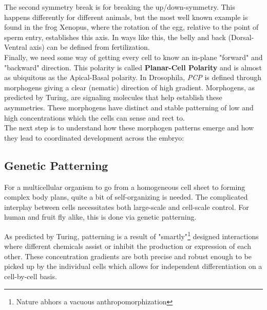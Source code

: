 The second symmetry break is for breaking the up/down-symmetry. This happens differently for different animals, but the most well known example is found in the frog Xenopus, where the rotation of the egg, relative to the point of sperm entry, establishes this axis. In ways like this, the belly and back (Dorsal-Ventral axis) can be defined from fertilization.\\

Finally, we need some way of getting every cell to know an in-plane "forward" and "backward" direction. This polarity is called \textbf{Planar-Cell Polarity} and is almost as ubiquitous as the Apical-Basal polarity. In Drosophila, \textit{PCP} is defined through morphogens giving a clear (nematic) direction of high gradient. Morphogens, as predicted by Turing, are signaling molecules that help establish these asymmetries. These morphogens have distinct and stable patterning of low and high concentrations which the cells can sense and rect to. \\
The next step is to understand how these morphogen patterns emerge and how they lead to coordinated development across the embryo:



\subsection{Genetic Patterning}
\label{sec:gen_patterns}
For a multicellular organism to go from a homogeneous cell sheet to forming complex body plans, quite a bit of self-organizing is needed. The complicated interplay between cells necessitates both large-scale and cell-scale control. For human and fruit fly alike, this is done via genetic patterning.\cite{veraksa2000developmental}

As predicted by Turing, patterning is a result of "smartly"\footnote{Nature abhors a vacuous anthropomorphization} designed interactions where different chemicals assist or inhibit the production or expression of each other. These concentration gradients are both precise and robust enough to be picked up by the individual cells which allows for independent differentiation on a cell-by-cell basis.\\


